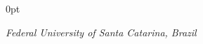 \documentclass[a4paper]{article}
\begin{document}
\begin{adjustwidth}{\parindent}{0pt}
\begin{minipage}[t]{0.65\textwidth}
\begin{minipage}[t]{0.8\textwidth}
{  \large{\textit{Federal University of Santa Catarina, Brazil}} \\
}
\end{minipage} \\ \\

\end{minipage}
\end{adjustwidth}
\end{document}
